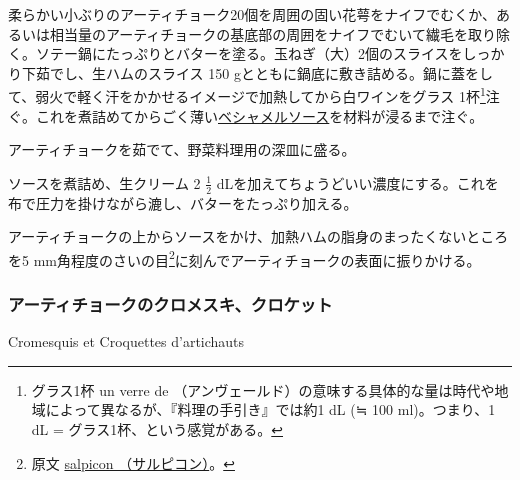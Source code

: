 \begin{recette}

柔らかい小ぶりのアーティチョーク20個を周囲の固い花萼をナイフでむくか、あるいは相当量のアーティチョークの基底部の周囲をナイフでむいて繊毛を取り除く。ソテー鍋にたっぷりとバターを塗る。玉ねぎ（大）2個のスライスをしっかり下茹でし、生ハムのスライス
150
gとともに鍋底に敷き詰める。鍋に蓋をして、弱火で軽く汗をかかせるイメージで加熱してから白ワインをグラス
1杯\footnote{グラス1杯 un verre de
  （アンヴェールド）の意味する具体的な量は時代や地域によって異なるが、『料理の手引き』では約1
  dL (≒ 100 ml)。つまり、1 dL = グラス1杯、という感覚がある。}注ぐ。これを煮詰めてからごく薄い\protect\hyperlink{sauce-bechamel}{ベシャメルソース}を材料が浸るまで注ぐ。

アーティチョークを茹でて、野菜料理用の深皿に盛る。

ソースを煮詰め、生クリーム 2 \(\frac{1}{2}\)
dLを加えてちょうどいい濃度にする。これを布で圧力を掛けながら漉し、バターをたっぷり加える。

アーティチョークの上からソースをかけ、加熱ハムの脂身のまったくないところを5
mm角程度のさいの目\footnote{原文
  \protect\hyperlink{salpicons-divers}{salpicon （サルピコン）}。}に刻んでアーティチョークの表面に振りかける。

\atoaki{}

\hypertarget{cromesquis-et-croquettes-d-artichauts}{%
\subsubsection{アーティチョークのクロメスキ、クロケット}\label{cromesquis-et-croquettes-d-artichauts}}

\begin{frsubenv}

Cromesquis et Croquettes d'artichauts

\end{frsubenv}



\end{recette}
